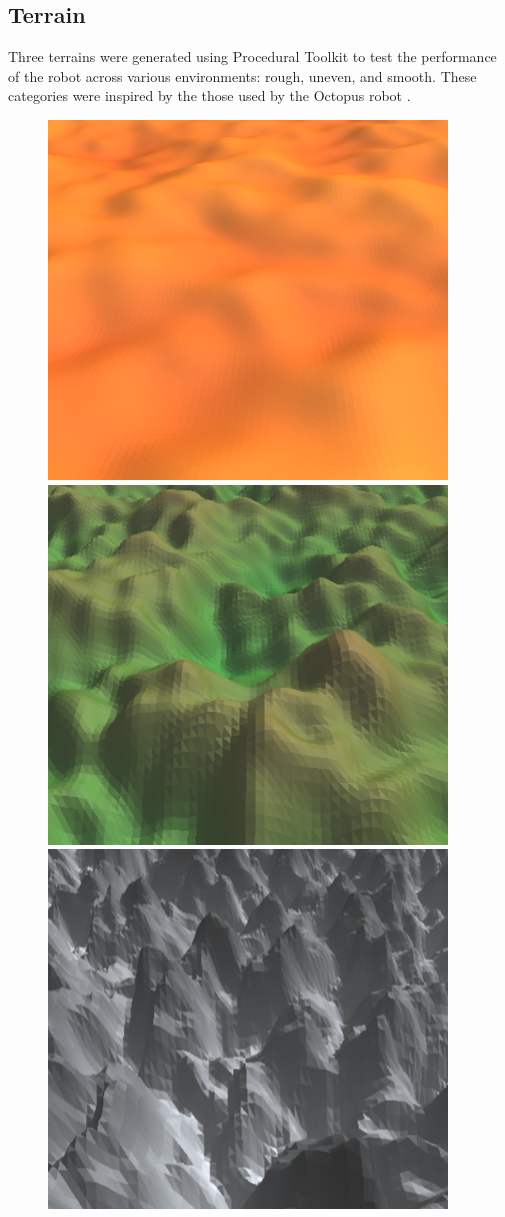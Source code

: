 \documentclass{article}
\begin{document}
\subsection{Terrain}
Three terrains were generated using Procedural Toolkit  to test the performance of the robot across various environments: rough, uneven, and smooth. These categories were inspired by the those used by the Octopus robot .\\
\begin{figure}[H]
\centering
\includegraphics[scale=0.3]{smoothTerrain}
\includegraphics[scale=0.3]{unevenTerrain}
\includegraphics[scale=0.3]{roughTerrain}

\end{figure}
\end{document}
